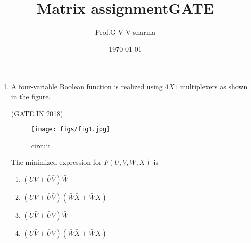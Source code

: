 \documentclass[12pt,-letter paper]{article}
\title{Matrix assignment}
\date{\today}
\author{Prof.G V V sharma}
\providecommand{\brak}[1]{\ensuremath{\left(#1\right)}}
\begin{document}
\title{\textbf{GATE}}

\maketitle
\begin{enumerate}
\item {} A four-variable Boolean function is realized using $4 X 1$
multiplexers as shown in the figure.




\hfill{(GATE IN 2018)}

  \begin{figure}[!ht]
   \texttt{[image: figs/fig1.jpg]}
         \caption{circuit}
   \label{fig:fig1}
  \end{figure}
 The minimized expression for $F(U,V,W,X)$ is
\begin{enumerate}
\item $\brak{UV+ \bar{U}\bar{V}}\bar{W}$
\item $\brak{UV+ \bar{U}\bar{V}}\brak{\bar{W}\bar{X}+\bar{W}X}$
\item $ \brak{U\bar{V}+\bar{U}V}\bar{W}$
\item $\brak{U\bar{V}+\bar{U}V}\brak{\bar{W}\bar{X}+\bar{W}X}$
\end{enumerate}
\end{enumerate}
\end{document}

